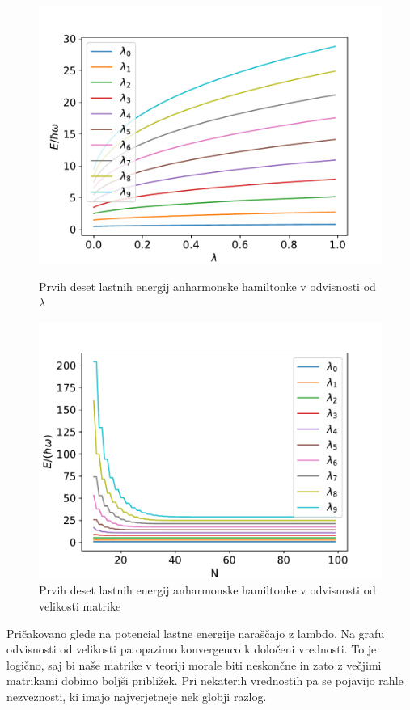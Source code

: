 \documentclass{article}
\begin{document}
\begin{figure}[H]
    \centering
    \begin{minipage}{0.49\textwidth}
        \centering
        \includegraphics[width=\linewidth]{energyfromlambda.pdf}
        \caption{Prvih deset lastnih energij anharmonske hamiltonke v odvisnosti od $\lambda$}
    \end{minipage}
    \hfill
    \begin{minipage}{0.49\textwidth}
        \centering
        \includegraphics[width=\linewidth]{energyfromN.pdf}
        \caption{Prvih deset lastnih energij anharmonske hamiltonke v odvisnosti od velikosti matrike}
    \end{minipage}
\end{figure}
Pričakovano glede na potencial lastne energije naraščajo z lambdo. Na grafu odvisnosti od velikosti pa opazimo konvergenco k določeni vrednosti. To je logično, saj bi naše matrike v teoriji morale biti neskončne in zato z večjimi matrikami dobimo boljši približek. Pri nekaterih vrednostih pa se pojavijo rahle nezveznosti, ki imajo najverjetneje nek globji razlog. 
\end{document}
